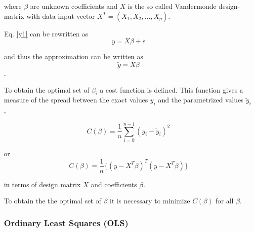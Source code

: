 \documentclass[a4paper,11pt,twocolumn]{article}
\begin{document}
where $\beta$ are unknown coefficients and $X$ is the so called Vandermonde design-matrix with data input vector $X^T=(X_1,X_2,...,X_p)$.

Eq. \eqref{y1} can be rewritten as 
\begin{equation}
y=X\beta+\epsilon
\end{equation}

and thus the approximation can be written as 
\begin{equation}
\tilde{y}=X\beta
\end{equation}
.

To obtain the optimal set of $\beta_i$ a cost function is defined. This function gives a measure of the spread between the exact values $y_i$ and the parametrized values 
$\tilde{y}_i$,

\begin{equation}
C(\beta)=\frac{1}{n}\sum\limits_{i=0}^{n-1}(y_i-\tilde{y}_i)^2
\end{equation}
    
or 
\begin{equation}
\label{c1}
C(\beta)=\frac{1}{n}\lbrace (y-X^T\beta)^T(y-X^T\beta) \rbrace
\end{equation}

in terms of design matrix $X$ and coefficients $\beta$.

To obtain the the optimal set of $\beta$ it is necessary to minimize $C(\beta)$ for all $\beta$. \cite{slides}


\subsubsection{Ordinary Least Squares (OLS)}


		 
\end{document}
